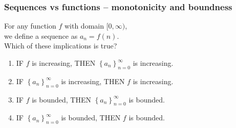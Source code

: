 \documentclass[14pt]{beamer}
\begin{document}


	\begin{frame}[t]
		\frametitle{Sequences vs functions -- monotonicity and boundness}

		For any function $f$ with domain $[0, \infty)$, \\ we define a sequence as $a
		_{n}= f(n)$. \\ Which of these implications is true?

		\begin{enumerate}
			\item IF $f$ is increasing, THEN
				$\displaystyle \left\{ a_{n} \right\}_{n=0}^{\infty}$ is increasing.
				\vfill

			\item IF $\displaystyle \left\{ a_{n} \right\}_{n=0}^{\infty}$ is increasing,
				THEN $f$ is increasing.
				\vfill

			\item IF $f$ is bounded, THEN
				$\displaystyle \left\{ a_{n} \right\}_{n=0}^{\infty}$ is bounded.
				\vfill

			\item IF $\displaystyle \left\{ a_{n} \right\}_{n=0}^{\infty}$ is bounded,
				THEN $f$ is bounded.
				\vfill
		\end{enumerate}
	\end{frame}
\end{document}
